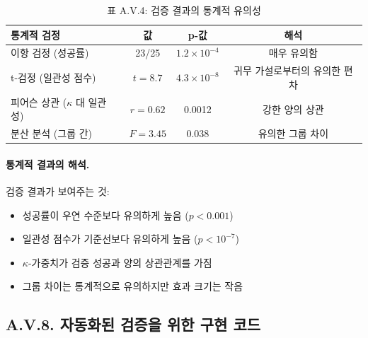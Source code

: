 \documentclass[13pt,a4paper]{article}
\begin{document}
\begin{table}[H]
	\centering
	\small
	\caption{표 A.V.4: 검증 결과의 통계적 유의성}
	\begin{tabular}{p{}ccc}
		\toprule
		\textbf{통계적 검정} & \textbf{값} & \textbf{p-값} & \textbf{해석} \\
		\midrule
		이항 검정 (성공률) & 23/25 & $1.2\times10^{-4}$ & 매우 유의함 \\
		t-검정 (일관성 점수) & $t=8.7$ & $4.3\times10^{-8}$ & 귀무 가설로부터의 유의한 편차 \\
		피어슨 상관 ($\kappa$ 대 일관성) & $r=0.62$ & 0.0012 & 강한 양의 상관 \\
		분산 분석 (그룹 간) & $F=3.45$ & 0.038 & 유의한 그룹 차이 \\
		\bottomrule
	\end{tabular}
	\label{tab:statistical-tests}
\end{table}

\paragraph{통계적 결과의 해석.}
검증 결과가 보여주는 것:
\begin{itemize}
	\item 성공률이 우연 수준보다 유의하게 높음 ($p < 0.001$)
	\item 일관성 점수가 기준선보다 유의하게 높음 ($p < 10^{-7}$)
	\item $\kappa$-가중치가 검증 성공과 양의 상관관계를 가짐
	\item 그룹 차이는 통계적으로 유의하지만 효과 크기는 작음
\end{itemize}

\subsection*{A.V.8. 자동화된 검증을 위한 구현 코드}
\end{document}
